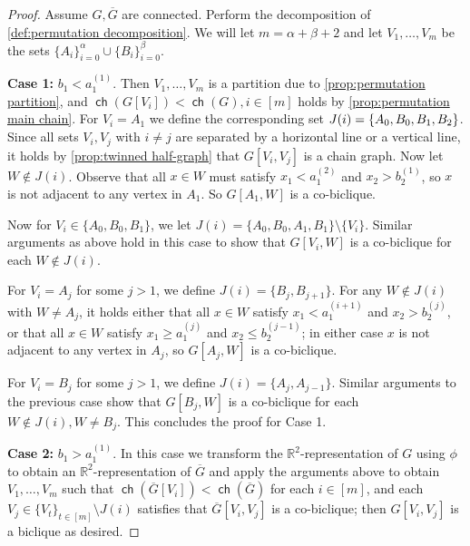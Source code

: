 \documentclass{article}
\newcommand{\bR}{\ensuremath{\mathbb{R}}}
\newcommand\splitaftercomma[1]{%
  \begingroup
  \begingroup\lccode`~=`, \lowercase{\endgroup
    \edef~{\mathchar\the\mathcode`, \penalty0 \noexpand\hspace{0pt plus .25em}}%
  }\mathcode`,="8000 #1%
  \endgroup
}
\DeclareMathOperator\ch{\mathsf{ch}}
\begin{document}
\begin{proof}
	Assume $G,\overline G$ are connected. Perform the decomposition of \cref{def:permutation
		decomposition}. We will let $m = \alpha+\beta+2$ and let $V_1, \dotsc, V_m$ be the sets
	$\{A_i\}_{i=0}^\alpha \cup \{B_i\}_{i=0}^\beta$.
	
	\textbf{Case 1:} $b_1 < a^{(1)}_1$. Then $V_1, \dotsc, V_m$ is a partition due to
	\cref{prop:permutation partition}, and $\ch(G[V_i]) < \ch(G), i \in [m]$ holds by \cref{prop:permutation main
		chain}. For $V_i = A_1$ we define the corresponding set $J(i) = \splitaftercomma{\{ A_0, B_0, B_1, B_2\}}$. Since all
	sets $V_i,V_j$ with $i \neq j$ are separated by a horizontal line or a vertical line, it holds by
	\cref{prop:twinned half-graph} that $G[V_i,V_j]$ is a chain graph. Now let $W \notin J(i)$.
	Observe that all $x \in W$ must satisfy $x_1 < a^{(2)}_1$ and $x_2 > b^{(1)}_2$, so $x$ is not
	adjacent to any vertex in $A_1$. So $G[A_1,W]$ is a co-biclique.
	
	Now for $V_i \in \{A_0, B_0, B_1\}$, we let $J(i) = \{ A_0, B_0, A_1, B_1\} \setminus \{V_i\}$. Similar
	arguments as above hold in this case to show that $G[V_i,W]$ is a co-biclique for each
	$W \notin J(i)$.
	
	For $V_i = A_j$ for some $j > 1$, we define $J(i) = \{ B_j, B_{j+1} \}$. For any $W \notin J(i)$
	with $W \neq A_j$, it holds either that all $x \in W$ satisfy $x_1 < a^{(i+1)}_1$ and $x_2 >
	b^{(j)}_2$, or that all $x \in W$ satisfy $x_1 \geq a^{(j)}_1$ and $x_2 \leq b^{(j-1)}_2$; in either
	case $x$ is not adjacent to any vertex in $A_j$, so $G[A_j,W]$ is a co-biclique.
	
	For $V_i = B_j$ for some $j > 1$, we define $J(i) = \{ A_j, A_{j-1} \}$. Similar arguments to the
	previous case show that $G[B_j, W]$ is a co-biclique for each $W \notin J(i), W \neq B_j$. This
	concludes the proof for Case 1.
	
	\textbf{Case 2:} $b_1 > a^{(1)}_1$. In this case we transform the $\bR^2$-representation of $G$
	using $\phi$ to obtain an $\bR^2$-representation of $\overline G$ and apply the arguments above to
	obtain $V_1, \dotsc, V_m$ such that $\ch(\overline G[V_i]) < \ch(\overline G)$ for each $i \in [m]$,
	and each $V_j \in \{V_t\}_{t \in [m]} \setminus J(i)$ satisfies that $\overline{G}[V_i,V_j]$ is a
	co-biclique; then $G[V_i,V_j]$ is a biclique as desired.
\end{proof}
\end{document}
